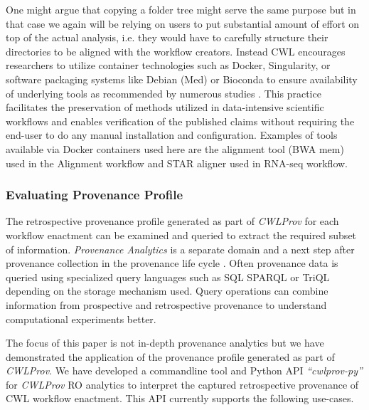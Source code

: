 \documentclass[a4paper,num-refs]{oup-contemporary}
\begin{document}
One might argue that copying a folder tree might serve the same purpose but in that case we again will be relying on users to put substantial amount of effort on top of the actual analysis, i.e. they would have to carefully structure their directories to be aligned with the workflow creators. Instead CWL encourages researchers to utilize container technologies such as Docker, Singularity, or software packaging systems like Debian (Med) or Bioconda to ensure availability of underlying tools as recommended by numerous studies \citep{belhajjame_2015, kanwal_2017, garijo_2017, stodden_2016, Stodden2014, Gruening2018}. This practice facilitates the preservation of methods utilized in data-intensive scientific workflows and enables verification of the published claims without requiring the end-user to do any manual installation and configuration. Examples of tools available via Docker containers used here are the alignment tool (BWA mem) used in the Alignment workflow and STAR aligner used in RNA-seq workflow.

\subsubsection{\textcolor{black}Evaluating Provenance Profile}
The retrospective provenance profile generated as part of \textit{CWLProv} for each workflow enactment can be examined and queried to extract the required subset of information. \textit{Provenance Analytics} is a separate domain and a next step after provenance collection in the provenance life cycle \citep{Missier2016}. Often provenance data is queried using specialized query languages such as SQL SPARQL or TriQL depending on the storage mechanism used. Query operations can combine information from prospective and retrospective provenance to understand computational experiments better. 

The focus of this paper is not in-depth provenance analytics but we have demonstrated the application of the provenance profile generated as part of \textit{CWLProv}. We have developed a commandline tool and Python API \textit{``cwlprov-py''} \citep{cwlprov-py} for \textit{CWLProv} RO analytics to interpret the captured retrospective provenance of CWL workflow enactment. This API currently supports the following use-cases.
\end{document}
